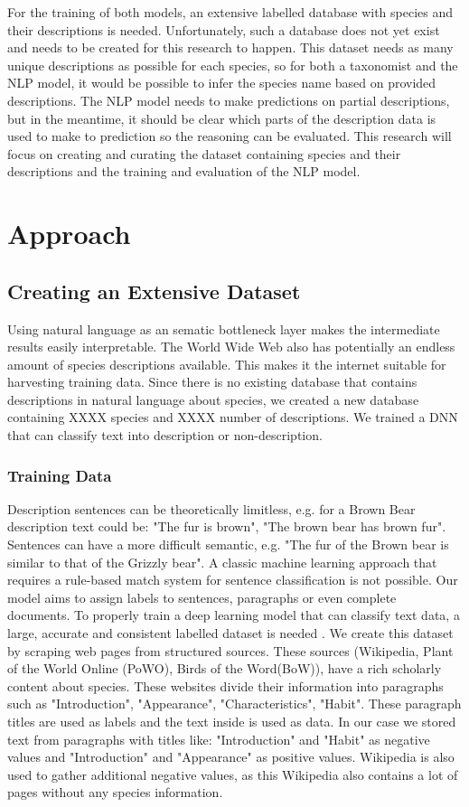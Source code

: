 \documentclass[a4paper, 12pt, oneside]{book} %
\begin{document}
For the training of both models, an extensive labelled database with species and their descriptions is needed. 
Unfortunately, such a database does not yet exist and needs to be created for this research to happen.
This dataset needs as many unique descriptions as possible for each species, so for both a taxonomist and the NLP model, it would be possible to infer the species name based on provided descriptions.
The NLP model needs to make predictions on partial descriptions, but in the meantime, it should be clear which parts of the description data is used to make to prediction so the reasoning can be evaluated.
This research will focus on creating and curating the dataset containing species and their descriptions and the training and evaluation of the NLP model.

\section{Approach}
\subsection{Creating an Extensive Dataset}
Using natural language as an sematic bottleneck layer makes the intermediate results easily interpretable. 
The World Wide Web also has potentially an endless amount of species descriptions available.
This makes it the internet suitable for harvesting training data.
Since there is no existing database that contains descriptions in natural language about species, we created a new database containing XXXX species and XXXX number of descriptions.
We trained a DNN that can classify text into description or non-description. 


\subsubsection{Training Data}
Description sentences can be theoretically limitless, e.g. for a Brown Bear description text could be: "The fur is brown", "The brown bear has brown fur".
Sentences can have a more difficult semantic, e.g. "The fur of the Brown bear is similar to that of the Grizzly bear".
A classic machine learning approach that requires a rule-based match system for sentence classification is not possible. 
Our model aims to assign labels to sentences, paragraphs or even complete documents. 
To properly train a deep learning model that can classify text data, a large, accurate and consistent labelled dataset is needed \autocite{munappy_data_2019}.
We create this dataset by scraping web pages from structured sources.
These sources (Wikipedia, Plant of the World Online (PoWO), Birds of the Word(BoW)), have a rich scholarly content about species.
These websites divide their information into paragraphs such as "Introduction", "Appearance", "Characteristics", "Habit".
These paragraph titles are used as labels and the text inside is used as data.
In our case we stored text from paragraphs with titles like:  "Introduction" and "Habit" as negative values and "Introduction" and "Appearance" as positive values. 
Wikipedia is also used to gather additional negative values, as this Wikipedia also contains a lot of pages without any species information.
\end{document}
